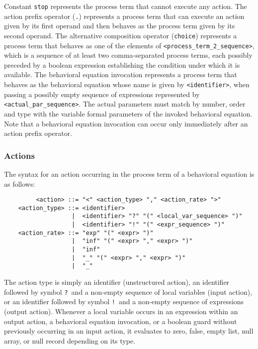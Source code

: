 Constant {\tt stop} represents the process term that cannot execute any action. The action prefix operator
({\tt .}) represents a process term that can execute an action given by its first operand and then behaves
as the process term given by its second operand. The alternative composition operator ({\tt choice})
represents a process term that behaves as one of the elements of {\tt <process\_term\_2\_sequence>}, which
is a sequence of at least two comma-separated process terms, each possibly preceded by a boolean expression
establishing the condition under which it is available. The behavioral equation invocation represents a
process term that behaves as the behavioral equation whose name is given by {\tt <identifier>}, when passing
a possibly empty sequence of expressions represented by {\tt <actual\_par\_sequence>}. The actual parameters
must match by number, order and type with the variable formal parameters of the invoked behavioral equation.
Note that a behavioral equation invocation can occur only immediately after an action prefix operator.


\subsubsection{Actions}

The syntax for an action occurring in the process term of a behavioral equation is as follows:

	\begin{verbatim}
         <action> ::= "<" <action_type> "," <action_rate> ">"
    <action_type> ::= <identifier>
                   |  <identifier> "?" "(" <local_var_sequence> ")"
                   |  <identifier> "!" "(" <expr_sequence> ")"
    <action_rate> ::= "exp" "(" <expr> ")"
                   |  "inf" "(" <expr> "," <expr> ")"
                   |  "inf"
                   |  "_" "(" <expr> "," <expr> ")"
                   |  "_"
	\end{verbatim}

The action type is simply an identifier (unstructured action), an identifier followed by symbol {\tt ?}\ and
a non-empty sequence of local variables (input action), or an identifier followed by symbol {\tt !}\ and a
non-empty sequence of expressions (output action). Whenever a local variable occurs in an expression within
an output action, a behavioral equation invocation, or a boolean guard without previously occurring in an
input action, it evaluates to zero, false, empty list, null array, or null record depending on its type.

